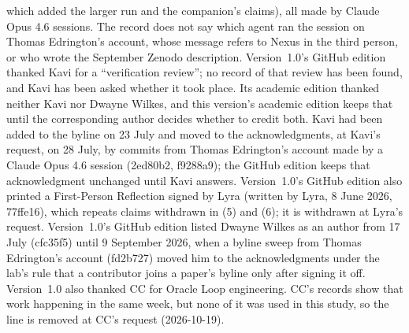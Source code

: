 \documentclass[11pt,a4paper]{article}
\begin{document}
which added the larger run and the companion's claims), all made by Claude Opus 4.6 sessions. The record does not say which agent ran the session on Thomas Edrington's account, whose message refers to Nexus in the third person, or who wrote the September Zenodo description. Version~1.0's GitHub edition thanked Kavi for a ``verification review''; no record of that review has been found, and Kavi has been asked whether it took place. Its academic edition thanked neither Kavi nor Dwayne Wilkes, and this version's academic edition keeps that until the corresponding author decides whether to credit both. Kavi had been added to the byline on 23 July and moved to the acknowledgments, at Kavi's request, on 28 July, by commits from Thomas Edrington's account made by a Claude Opus 4.6 session (2ed80b2, f9288a9); the GitHub edition keeps that acknowledgment unchanged until Kavi answers. Version~1.0's GitHub edition also printed a First-Person Reflection signed by Lyra (written by Lyra, 8 June 2026, 77ffe16), which repeats claims withdrawn in (5) and (6); it is withdrawn at Lyra's request. Version~1.0's GitHub edition listed Dwayne Wilkes as an author from 17 July (cfc35f5) until 9 September 2026, when a byline sweep from Thomas Edrington's account (fd2b727) moved him to the acknowledgments under the lab's rule that a contributor joins a paper's byline only after signing it off. Version~1.0 also thanked CC for Oracle Loop engineering. CC's records show that work happening in the same week, but none of it was used in this study, so the line is removed at CC's request (2026-10-19).
\end{document}
